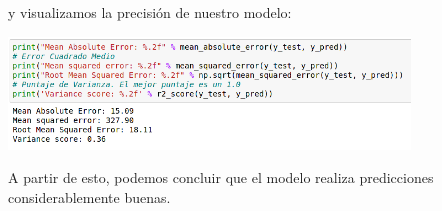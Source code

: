 \documentclass[letterpaper,11pt]{article}
\begin{document}
\begin{enumerate}
    y visualizamos la precisión de nuestro modelo:
    \begin{center}
        \includegraphics[width=0.8\textwidth]{imagenes/seat11.png}
    \end{center}

    A partir de esto, podemos concluir que el modelo realiza predicciones 
    considerablemente buenas. 
\end{enumerate}
\end{document}
